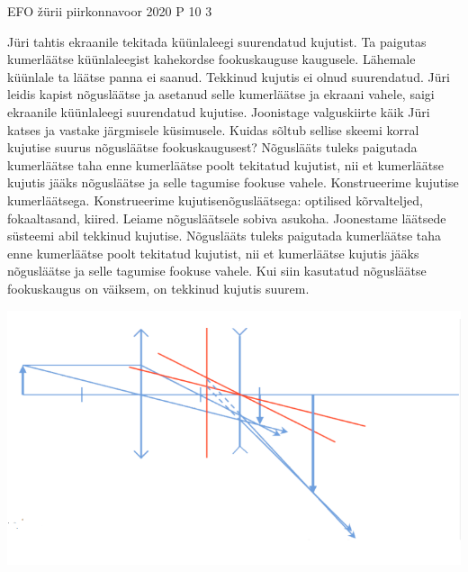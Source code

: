 {EFO žürii} %
{piirkonnavoor} %
{2020} %
{P 10} %
{3} %
{
\ifStatement
Jüri tahtis ekraanile tekitada küünlaleegi suurendatud kujutist. Ta paigutas kumerläätse küünlaleegist kahekordse fookuskauguse kaugusele. Lähemale küünlale ta läätse panna ei saanud. Tekkinud kujutis ei olnud suurendatud. Jüri leidis kapist nõgusläätse ja asetanud selle kumerläätse ja ekraani vahele, saigi ekraanile küünlaleegi suurendatud kujutise. Joonistage valguskiirte käik Jüri katses ja vastake järgmisele küsimusele. Kuidas sõltub sellise skeemi korral kujutise suurus nõgusläätse fookuskaugusest?
\fi
\ifHint
Nõguslääts tuleks paigutada kumerläätse taha enne kumerläätse poolt tekitatud kujutist, nii et kumerläätse kujutis jääks nõgusläätse ja selle tagumise fookuse vahele.
\fi
\ifSolution
Konstrueerime kujutise kumerläätsega. Konstrueerime kujutisenõgusläätsega: optilised kõrvalteljed, fokaaltasand, kiired. Leiame nõgusläätsele sobiva asukoha. Joonestame läätsede süsteemi abil tekkinud kujutise. Nõguslääts tuleks paigutada kumerläätse taha enne kumerläätse poolt tekitatud kujutist, nii et kumerläätse kujutis jääks nõgusläätse ja selle tagumise fookuse vahele. Kui siin kasutatud nõgusläätse fookuskaugus on väiksem, on tekkinud kujutis suurem.
\begin{center}
	\includegraphics[width=0.5\linewidth]{2020-v2p-10-lah.PNG}
\end{center}
\fi
}
